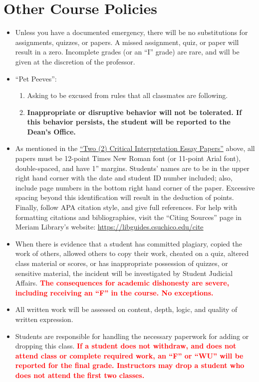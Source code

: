 \documentclass[11pt,]{article}
\providecommand{\tightlist}{%
  \setlength{\itemsep}{0pt}\setlength{\parskip}{0pt}}
\begin{document}
\hypertarget{other-course-policies}{%
\section{Other Course Policies}\label{other-course-policies}}

\begin{itemize}
\item
  Unless you have a documented emergency, there will be no substitutions
  for assignments, quizzes, or papers. A missed assignment, quiz, or
  paper will result in a zero. Incomplete grades (or an ``I'' grade) are
  rare, and will be given at the discretion of the professor.
\item
  ``Pet Peeves'':

  \begin{enumerate}
  \def\labelenumi{\arabic{enumi}.}
  \tightlist
  \item
    Asking to be excused from rules that all classmates are following.
  \item
    \textbf{Inappropriate or disruptive behavior will not be tolerated.
    If this behavior persists, the student will be reported to the
    Dean's Office.}
  \end{enumerate}
\item
  As mentioned in the \protect\hyperlink{writing_assignments}{``Two (2)
  Critical Interpretation Essay Papers''} above, all papers must be
  12-point Times New Roman font (or 11-point Arial font), double-spaced,
  and have 1'' margins. Students' names are to be in the upper right
  hand corner with the date and student ID number included; also,
  include page numbers in the bottom right hand corner of the paper.
  Excessive spacing beyond this identification will result in the
  deduction of points. Finally, follow APA citation style, and give full
  references. For help with formatting citations and bibliographies,
  visit the ``Citing Sources'' page in Meriam Library's website:
  \url{https://libguides.csuchico.edu/cite}
\item
  When there is evidence that a student has committed plagiary, copied
  the work of others, allowed others to copy their work, cheated on a
  quiz, altered class material or scores, or has inappropriate
  possession of quizzes, or sensitive material, the incident will be
  investigated by Student Judicial Affairs.
  \textcolor{red}{\bf{The consequences for academic dishonesty are severe, including receiving an “F” in the course. No exceptions.}}
\item
  All written work will be assessed on content, depth, logic, and
  quality of written expression.
\item
  Students are responsible for handling the necessary paperwork for
  adding or dropping this class.
  \textcolor{red}{\bf{If a student does not withdraw, and does not attend class or complete required work, an “F” or “WU” will be reported for the final grade. Instructors may drop a student who does not attend the first two classes.}}
\end{itemize}
\end{document}
